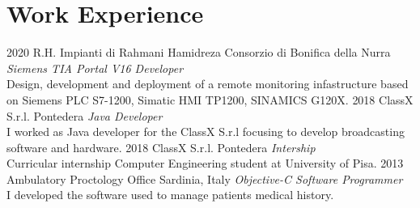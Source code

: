 \documentclass[]{friggeri-cv}
\begin{document}
\section{Work Experience}
\vspace{-3mm}
\begin{entrylist}
\entry
{2020}
{R.H. Impianti di Rahmani Hamidreza}
{Consorzio di Bonifica della Nurra}
{\emph{Siemens TIA Portal V16 Developer}\\
Design, development and deployment of a remote monitoring infastructure based
on Siemens PLC S7-1200, Simatic HMI TP1200, SINAMICS G120X.}
\entry
{2018}
{ClassX S.r.l.}
{Pontedera}
{\emph{Java Developer} \\
I worked as Java developer for the ClassX S.r.l focusing to develop broadcasting software and hardware.}
\entry
{2018}
{ClassX S.r.l.}
{Pontedera}
{\emph{Intership} \\
Curricular internship Computer Engineering student at University of Pisa.}
\entry
{2013}
{Ambulatory Proctology Office}
{Sardinia, Italy}
{\emph{Objective-C Software Programmer} \\
I developed the software used to manage patients medical history.}
\end{entrylist}
\clearpage
\end{document}
